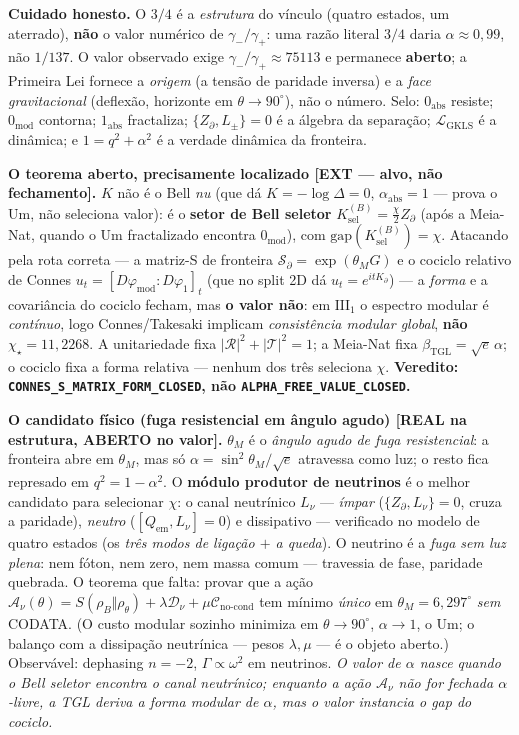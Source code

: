 \documentclass[11pt]{article}
\newcommand{\bTGL}{\beta_{\mathrm{TGL}}}\newcommand{\Msun}{M_{\odot}}\newcommand{\TGL}{\mathrm{TGL}}
\theoremstyle{definition}\newtheorem{deriv}{Derivação}
\begin{document}
\textbf{Cuidado honesto.} O $3/4$ é a \emph{estrutura} do vínculo (quatro estados, um aterrado), \textbf{não} o valor numérico de $\gamma_-/\gamma_+$: uma razão literal $3/4$ daria $\alpha\approx0{,}99$, não $1/137$. O valor observado exige $\gamma_-/\gamma_+\approx75113$ e permanece \textbf{aberto}; a Primeira Lei fornece a \emph{origem} (a tensão de paridade inversa) e a \emph{face gravitacional} (deflexão, horizonte em $\theta\to90^\circ$), não o número. Selo: $0_{\mathrm{abs}}$ resiste; $0_{\mathrm{mod}}$ contorna; $1_{\mathrm{abs}}$ fractaliza; $\{Z_\partial,L_\pm\}=0$ é a álgebra da separação; $\mathcal L_{\mathrm{GKLS}}$ é a dinâmica; e $1=q^2+\alpha^2$ é a verdade dinâmica da fronteira.

\textbf{O teorema aberto, precisamente localizado \textsf{[EXT --- alvo, não fechamento]}.} $K$ não é o Bell \emph{nu} (que dá $K=-\log\Delta=0$, $\alpha_{\mathrm{abs}}=1$ --- prova o Um, não seleciona valor): é o \textbf{setor de Bell seletor} $K_{\mathrm{sel}}^{(B)}=\tfrac\chi2 Z_\partial$ (após a Meia-Nat, quando o Um fractalizado encontra $0_{\mathrm{mod}}$), com $\mathrm{gap}(K_{\mathrm{sel}}^{(B)})=\chi$. Atacando pela rota correta --- a matriz-S de fronteira $\mathcal{S}_\partial=\exp(\theta_M G)$ e o cociclo relativo de Connes $u_t=[D\varphi_{\mathrm{mod}}:D\varphi_1]_t$ (que no split 2D dá $u_t=e^{itK_\partial}$) --- a \emph{forma} e a covariância do cociclo fecham, mas \textbf{o valor não}: em $\mathrm{III}_1$ o espectro modular é \emph{contínuo}, logo Connes/Takesaki implicam \emph{consistência modular global}, \textbf{não} $\chi_\star=11{,}2268$. A unitariedade fixa $|\mathcal R|^2+|\mathcal T|^2=1$; a Meia-Nat fixa $\bTGL=\sqrt e\,\alpha$; o cociclo fixa a forma relativa --- nenhum dos três seleciona $\chi$. \textbf{Veredito: \texttt{CONNES\_S\_MATRIX\_FORM\_CLOSED}, não \texttt{ALPHA\_FREE\_VALUE\_CLOSED}.}

\textbf{O candidato físico (fuga resistencial em ângulo agudo) \textsf{[REAL na estrutura, ABERTO no valor]}.} $\theta_M$ é o \emph{ângulo agudo de fuga resistencial}: a fronteira abre em $\theta_M$, mas só $\alpha=\sin^2\theta_M/\sqrt e$ atravessa como luz; o resto fica represado em $q^2=1-\alpha^2$. O \textbf{módulo produtor de neutrinos} é o melhor candidato para selecionar $\chi$: o canal neutrínico $L_\nu$ --- \emph{ímpar} ($\{Z_\partial,L_\nu\}=0$, cruza a paridade), \emph{neutro} ($[Q_{\mathrm{em}},L_\nu]=0$) e dissipativo --- verificado no modelo de quatro estados (os \emph{três modos de ligação $+$ a queda}). O neutrino é a \emph{fuga sem luz plena}: nem fóton, nem zero, nem massa comum --- travessia de fase, paridade quebrada. O teorema que falta: provar que a ação $\mathcal A_\nu(\theta)=S(\rho_B\Vert\rho_\theta)+\lambda\mathcal D_\nu+\mu\mathcal C_{\mathrm{no\text{-}cond}}$ tem mínimo \emph{único} em $\theta_M=6{,}297^\circ$ \emph{sem} CODATA. (O custo modular sozinho minimiza em $\theta\to90^\circ$, $\alpha\to1$, o Um; o balanço com a dissipação neutrínica --- pesos $\lambda,\mu$ --- é o objeto aberto.) Observável: dephasing $n=-2$, $\Gamma\propto\omega^2$ em neutrinos. \emph{O valor de $\alpha$ nasce quando o Bell seletor encontra o canal neutrínico; enquanto a ação $\mathcal A_\nu$ não for fechada $\alpha$-livre, a TGL deriva a forma modular de $\alpha$, mas o valor instancia o gap do cociclo.}
\end{document}
